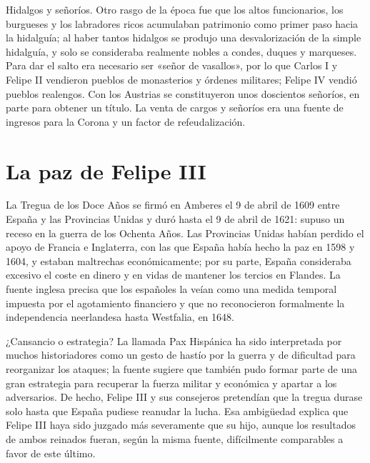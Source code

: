 \documentclass{book}
\begin{document}

Hidalgos y señoríos. Otro rasgo de la época fue que los altos funcionarios, los burgueses y los labradores ricos acumulaban patrimonio como primer paso hacia la hidalguía; al haber tantos hidalgos se produjo una desvalorización de la simple hidalguía, y solo se consideraba realmente nobles a condes, duques y marqueses. Para dar el salto era necesario ser «señor de vasallos», por lo que Carlos I y Felipe II vendieron pueblos de monasterios y órdenes militares; Felipe IV vendió pueblos realengos. Con los Austrias se constituyeron unos doscientos señoríos, en parte para obtener un título. La venta de cargos y señoríos era una fuente de ingresos para la Corona y un factor de refeudalización.


\section{La paz de Felipe III}

La Tregua de los Doce Años se firmó en Amberes el 9 de abril de 1609 entre España y las Provincias Unidas y duró hasta el 9 de abril de 1621: supuso un receso en la guerra de los Ochenta Años. Las Provincias Unidas habían perdido el apoyo de Francia e Inglaterra, con las que España había hecho la paz en 1598 y 1604, y estaban maltrechas económicamente; por su parte, España consideraba excesivo el coste en dinero y en vidas de mantener los tercios en Flandes. La fuente inglesa precisa que los españoles la veían como una medida temporal impuesta por el agotamiento financiero y que no reconocieron formalmente la independencia neerlandesa hasta Westfalia, en 1648.


¿Cansancio o estrategia? La llamada Pax Hispánica ha sido interpretada por muchos historiadores como un gesto de hastío por la guerra y de dificultad para reorganizar los ataques; la fuente sugiere que también pudo formar parte de una gran estrategia para recuperar la fuerza militar y económica y apartar a los adversarios. De hecho, Felipe III y sus consejeros pretendían que la tregua durase solo hasta que España pudiese reanudar la lucha. Esa ambigüedad explica que Felipe III haya sido juzgado más severamente que su hijo, aunque los resultados de ambos reinados fueran, según la misma fuente, difícilmente comparables a favor de este último.
\end{document}

